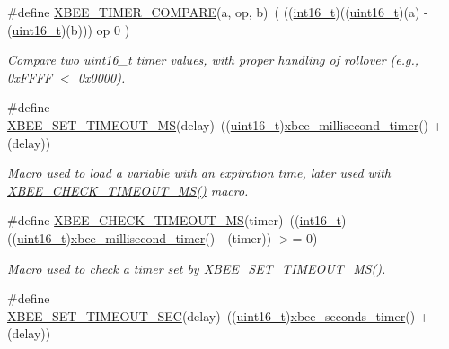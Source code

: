 \begin{DoxyCompactItemize}
\#define \hyperlink{group__hal_ga9a3ee9eece1e3ee1c6fbaa27bc0928d3}{X\+B\+E\+E\+\_\+\+T\+I\+M\+E\+R\+\_\+\+C\+O\+M\+P\+A\+RE}(a,  op,  b)~( ((\hyperlink{group__hal__dos_ga2140805d08462d474b82ddc8d1c2f3e6}{int16\+\_\+t})((\hyperlink{group__hal__dos_ga5a8b2dc9e45a9ee81a94ef304fb62505}{uint16\+\_\+t})(a) -\/ (\hyperlink{group__hal__dos_ga5a8b2dc9e45a9ee81a94ef304fb62505}{uint16\+\_\+t})(b))) op 0 )
\begin{DoxyCompactList}\small\item\em Compare two uint16\+\_\+t timer values, with proper handling of rollover (e.\+g., 0x\+F\+F\+FF $<$ 0x0000). \end{DoxyCompactList}\item 
\#define \hyperlink{group__hal_ga848a9903fa7859d84cb22aeddde4c42f}{X\+B\+E\+E\+\_\+\+S\+E\+T\+\_\+\+T\+I\+M\+E\+O\+U\+T\+\_\+\+MS}(delay)~((\hyperlink{group__hal__dos_ga5a8b2dc9e45a9ee81a94ef304fb62505}{uint16\+\_\+t})\hyperlink{group__hal_ga22b4e3df788254ca5f8530e9aee58515}{xbee\+\_\+millisecond\+\_\+timer}() + (delay))
\begin{DoxyCompactList}\small\item\em Macro used to load a variable with an expiration time, later used with \hyperlink{group__hal_gac3485c3c34a50a5a35d553cc743d163e}{X\+B\+E\+E\+\_\+\+C\+H\+E\+C\+K\+\_\+\+T\+I\+M\+E\+O\+U\+T\+\_\+\+M\+S()} macro. \end{DoxyCompactList}\item 
\#define \hyperlink{group__hal_gac3485c3c34a50a5a35d553cc743d163e}{X\+B\+E\+E\+\_\+\+C\+H\+E\+C\+K\+\_\+\+T\+I\+M\+E\+O\+U\+T\+\_\+\+MS}(timer)~((\hyperlink{group__hal__dos_ga2140805d08462d474b82ddc8d1c2f3e6}{int16\+\_\+t})((\hyperlink{group__hal__dos_ga5a8b2dc9e45a9ee81a94ef304fb62505}{uint16\+\_\+t})\hyperlink{group__hal_ga22b4e3df788254ca5f8530e9aee58515}{xbee\+\_\+millisecond\+\_\+timer}() -\/ (timer)) $>$= 0)
\begin{DoxyCompactList}\small\item\em Macro used to check a timer set by \hyperlink{group__hal_ga848a9903fa7859d84cb22aeddde4c42f}{X\+B\+E\+E\+\_\+\+S\+E\+T\+\_\+\+T\+I\+M\+E\+O\+U\+T\+\_\+\+M\+S()}. \end{DoxyCompactList}\item 
\#define \hyperlink{group__hal_ga6adb5c9e19c84a261c569ff4d77d1170}{X\+B\+E\+E\+\_\+\+S\+E\+T\+\_\+\+T\+I\+M\+E\+O\+U\+T\+\_\+\+S\+EC}(delay)~((\hyperlink{group__hal__dos_ga5a8b2dc9e45a9ee81a94ef304fb62505}{uint16\+\_\+t})\hyperlink{group__hal_ga5c1a8bccd41acf1d7264a75698077749}{xbee\+\_\+seconds\+\_\+timer}() + (delay))

\end{DoxyCompactItemize}
